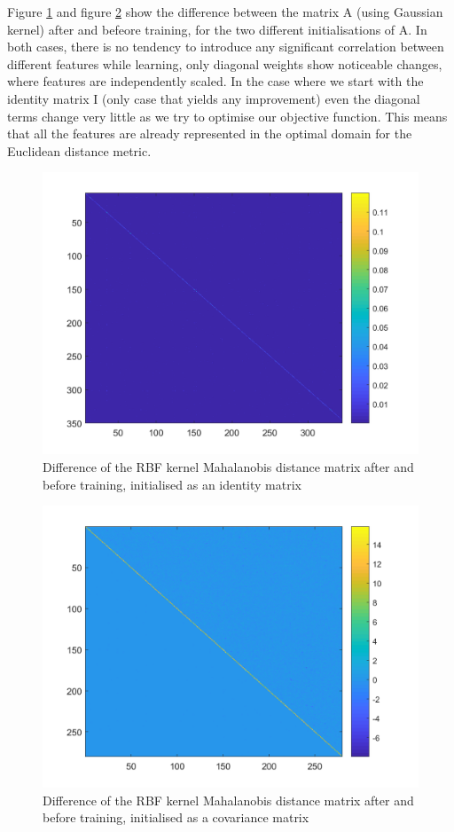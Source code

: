\documentclass[10pt,technote]{IEEEtran}
\begin{document}
Figure \ref{fig:diff_matrix} and figure \ref{fig:diff_matrix_cov} show the difference between the matrix A (using Gaussian kernel) after and befeore training, for the two different initialisations of A. In both cases, there is no tendency to introduce any significant correlation between different features while learning, only diagonal weights show noticeable changes, where features are independently scaled. In the case where we start with the identity matrix I (only case that yields any improvement) even the diagonal terms change very little as we try to optimise our objective function. This means that all the features are already represented in the optimal domain for the Euclidean distance metric.

\begin{figure}
    \centering
    \includegraphics[width=\linewidth]{Graphs/A_matrix_diff.png}
    \caption{Difference of the RBF kernel Mahalanobis distance matrix after and before training, initialised as an identity matrix}
    \label{fig:diff_matrix}
\end{figure}

\begin{figure}
    \centering
    \includegraphics[width=\linewidth]{Graphs/A_matrix_diff_cov.png}
    \caption{Difference of the RBF kernel Mahalanobis distance matrix after and before training, initialised as a covariance matrix}
    \label{fig:diff_matrix_cov}
\end{figure}
\end{document}
